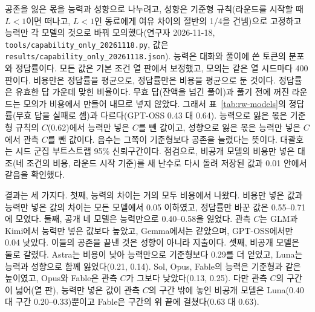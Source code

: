 {\color{blue}공존을 잃은 몫을 능력과 성향으로 나누려고, 성향은 기준형 규칙(라운드를 시작할 때 $L<1$이면 떠나고, $L<1$인 동료에게 여유 차이의 절반의 1/4을 건넴)으로 고정하고 능력만 각 모델의 것으로 바꿔 모의했다(연구자 2026-11-18, \texttt{tools/capability\_only\_20261118.py}, 값은 \texttt{results/capability\_only\_20261118.json}). 능력은 대화와 풀이에 쓴 토큰의 분포와 정답률이다. 모든 값은 기본 조건 열 판에서 보정했고, 모의는 같은 열 시드마다 400판이다. 비용만은 정답률을 평균으로, 정답률만은 비용을 평균으로 둔 것이다. 정답률은 유효한 답 가운데 맞힌 비율이다. 무효 답(잔액을 넘긴 풀이)과 풀기 전에 꺼진 라운드는 모의가 비용에서 만들어 내므로 넣지 않았다. 그래서 표~\ref{tab:rw-models}의 정답률(무효 답을 실패로 셈)과 다르다(GPT-OSS 0.43 대 0.64). 능력으로 잃은 몫은 기준형 규칙의 $C$(0.62)에서 능력만 넣은 $C$를 뺀 값이고, 성향으로 잃은 몫은 능력만 넣은 $C$에서 관측 $C$를 뺀 값이다. 음수는 그쪽이 기준형보다 공존을 늘렸다는 뜻이다. 대괄호는 시드 군집 부트스트랩 95\% 신뢰구간이다. 점검으로, 비공개 모델의 비용만 넣은 대조(네 조건의 비용, 라운드 시작 기준)를 새 난수로 다시 돌려 저장된 값과 0.01 안에서 같음을 확인했다.

결과는 세 가지다. 첫째, 능력의 차이는 거의 모두 비용에서 나왔다. 비용만 넣은 값과 능력만 넣은 값의 차이는 모든 모델에서 0.05 이하였고, 정답률만 바꾼 값은 0.55--0.71에 모였다. 둘째, 공개 네 모델은 능력만으로 0.40--0.58을 잃었다. 관측 $C$는 GLM과 Kimi에서 능력만 넣은 값보다 높았고, Gemma에서는 같았으며, GPT-OSS에서만 0.04 낮았다. 이들의 공존을 끝낸 것은 성향이 아니라 지출이다. 셋째, 비공개 모델은 둘로 갈렸다. Astra는 비용이 낮아 능력만으로 기준형보다 0.29를 더 얻었고, Luna는 능력과 성향으로 함께 잃었다(0.21, 0.14). Sol, Opus, Fable의 능력은 기준형과 같은 높이였고, Opus와 Fable은 관측 $C$가 그보다 낮았다(0.13, 0.25). 다만 관측 $C$의 구간이 넓어(열 판), 능력만 넣은 값이 관측 $C$의 구간 밖에 놓인 비공개 모델은 Luna(0.40 대 구간 0.20--0.33)뿐이고 Fable은 구간의 위 끝에 걸쳤다(0.63 대 0.63).}

\begin{table}[h]
\centering
\small

\caption{\textcolor{blue}{능력만 넣은 대조. 성향은 기준형 규칙으로 고정하고 능력(비용, 정답률, 또는 둘 다)만 각 모델의 것으로 바꾼 모의의 공존 유지율 $C$와, 이로부터 나눈 잃은 공존. 능력 $=$ 기준형 $C$ $-$ 능력만 $C$, 성향 $=$ 능력만 $C$ $-$ 관측 $C$.}}
\label{tab:app-capability-only-20261118}
\end{table}


